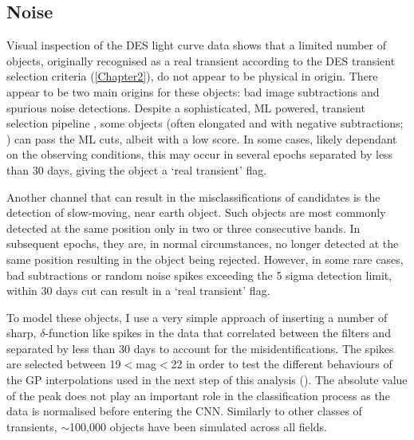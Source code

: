 \subsection{Noise}
Visual inspection of the DES light curve data shows that a limited number of objects, originally recognised as a real transient according to the DES transient selection criteria (\cref{Chapter2}), do not appear to be physical in origin. There appear to be two main origins for these objects: bad image subtractions and spurious noise detections. Despite a sophisticated, ML powered, transient selection pipeline \citep{Goldstein2015}, some objects (often elongated and with negative subtractions; ) can pass the ML cuts, albeit with a low score. In some cases, likely dependant on the observing conditions, this may occur in several epochs separated by less than 30 days, giving the object a `real transient' flag.

Another channel that can result in the misclassifications of candidates is the detection of slow-moving, near earth object. Such objects are most commonly detected at the same position only in two or three consecutive bands. In subsequent epochs, they are, in normal circumstances, no longer detected at the same position resulting in the object being rejected. However, in some rare cases, bad subtractions or random noise spikes exceeding the 5 sigma detection limit, within 30 days cut can result in a `real transient' flag.

\begin{figure}
  \caption{}
  \label{fig:BadSubtractions}
\end{figure}

To model these objects, I use a very simple approach of inserting a number of sharp, $\delta$-function like spikes in the data that correlated between the filters and separated by less than 30 days to account for the misidentifications. The spikes are selected between 19$<$mag$<$22 in order to test the different behaviours of the GP interpolations used in the next step of this analysis (). The absolute value of the peak does not play an important role in the classification process as the data is normalised before entering the CNN. Similarly to other classes of transients, $\sim$100,000 objects have been simulated across all fields.

